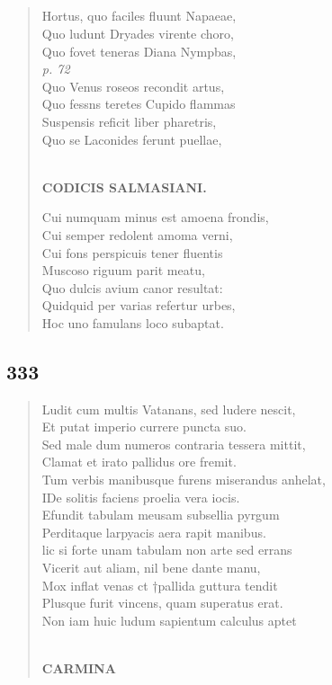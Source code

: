\documentclass[11pt, a4paper]{report}
\begin{document}
            \subsection*{}
      \begin{verse}
      Hortus, quo faciles fluunt Napaeae, \\ Quo ludunt Dryades virente choro, \\ Quo fovet teneras Diana Nympbas, \\ \textit{p. 72} \\ Quo Venus roseos recondit artus, \\ Quo fessns teretes Cupido flammas \\ Suspensis reficit liber pharetris, \\ Quo se Laconides ferunt puellae, \\ 
        ﻿\pagebreak 
    \begin{center} \textbf{CODICIS SALMASIANI.} \end{center} \marginpar{[269]} Cui numquam minus est amoena frondis, \\ Cui semper redolent amoma verni, \\ Cui fons perspicuis tener fluentis \\ Muscoso riguum parit meatu, \\ Quo dulcis avium canor resultat: \\ Quidquid per varias refertur urbes, \\ Hoc uno famulans loco subaptat. \\ 
      \end{verse}
  
            \subsection*{333}
      \begin{verse}
      Ludit cum multis Vatanans, sed ludere nescit, \\ Et putat imperio currere puncta suo. \\ Sed male dum numeros contraria tessera mittit, \\ Clamat et irato pallidus ore fremit. \\ Tum verbis manibusque furens miserandus anhelat, \\ IDe solitis faciens proelia vera iocis. \\ Efundit tabulam meusam subsellia pyrgum \\ Perditaque larpyacis aera rapit manibus. \\ lic si forte unam tabulam non arte sed errans \\ Vicerit aut aliam, nil bene dante manu, \\ Mox inflat venas ct †pallida guttura tendit \\ Plusque furit vincens, quam superatus erat. \\ Non iam huic ludum sapientum calculus aptet \\ 
        ﻿\pagebreak 
     \marginpar{[270]} \begin{center} \textbf{CARMINA} \end{center}
      \end{verse}
  
\end{document}
